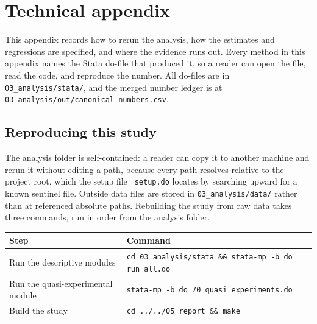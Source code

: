 \section{Technical appendix}
\label{sec:appendix}

This appendix records how to rerun the analysis, how the estimates and
regressions are specified, and where the evidence runs out. Every method in
this appendix names the Stata do-file that produced it, so a reader can open
the file, read the code, and reproduce the number. All do-files are in
\texttt{03\_analysis/stata/}, and the merged number ledger is at
\texttt{03\_analysis/out/canonical\_numbers.csv}.

\subsection{Reproducing this study}

The analysis folder is self-contained: a reader can copy it to another machine
and rerun it without editing a path, because every path resolves relative to
the project root, which the setup file \texttt{\_setup.do} locates by
searching upward for a known sentinel file. Outside data files are stored in
\texttt{03\_analysis/data/} rather than at referenced absolute paths.
Rebuilding the study from raw data takes three commands, run in order from
the analysis folder.

\begin{center}
{\footnotesize
\begin{tabular}{@{}B{4.2cm} P{12.6cm}@{}}
\toprule
\textbf{Step} & \textbf{Command} \\
\midrule
Run the descriptive modules & \texttt{cd 03\_analysis/stata \&\& stata-mp -b do run\_all.do} \\
\rowrule
Run the quasi-experimental module & \texttt{stata-mp -b do 70\_quasi\_experiments.do} \\
\rowrule
Build the study & \texttt{cd ../../05\_report \&\& make} \\
\bottomrule
\end{tabular}}
\end{center}


